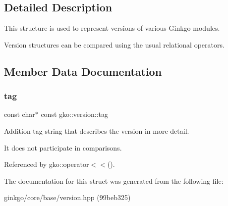 \subsection{Detailed Description}
This structure is used to represent versions of various Ginkgo modules. 

Version structures can be compared using the usual relational operators. 

\subsection{Member Data Documentation}
\mbox{\label{structgko_1_1version_a1bd0eaa4d551c145ff9cd0c10e555ac3}} 
\subsubsection{\texorpdfstring{tag}{tag}}
{\footnotesize\ttfamily const char$\ast$ const gko\+::version\+::tag}



Addition tag string that describes the version in more detail. 

It does not participate in comparisons. 

Referenced by gko\+::operator$<$$<$().



The documentation for this struct was generated from the following file\+:\begin{DoxyCompactItemize}
\item 
ginkgo/core/base/version.\+hpp (99beb325)\end{DoxyCompactItemize}
